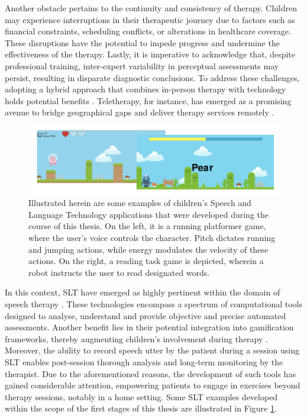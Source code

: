 Another obstacle pertains to the continuity and consistency of therapy. Children may experience interruptions in their therapeutic journey due to factors such as financial constraints, scheduling conflicts, or alterations in healthcare coverage. These disruptions have the potential to impede progress and undermine the effectiveness of the therapy. Lastly, it is imperative to acknowledge that, despite professional training, inter-expert variability in perceptual assessments may persist, resulting in disparate diagnostic conclusions. To address these challenges, adopting a hybrid approach that combines in-person therapy with technology holds potential benefits \cite{hilty2015new,barnett2011utilizing}. Teletherapy, for instance, has emerged as a promising avenue to bridge geographical gaps and deliver therapy services remotely \cite{hughes2019increasing}.

\begin{figure}
    \centering
    \includegraphics[width=1\textwidth]{imgs/exampleSLT.png}
    \caption{Illustrated herein are some examples of children's Speech and Language Technology applications that were developed during the course of this thesis. On the left, it is a running platformer game, where the user's voice controls the character. Pitch dictates running and jumping actions, while energy modulates the velocity of these actions. On the right, a reading task game is depicted, wherein a robot instructs the user to read designated words.}
    \label{fig:exSLT}

\end{figure}

In this context, \ac{SLT} have emerged as highly pertinent within the domain of speech therapy \cite{mendoza2022added}. These technologies encompass a spectrum of computational tools designed to analyse, understand and provide objective and precise automated assessments. Another benefit lies in their potential integration into gamification frameworks, thereby augmenting children's involvement during therapy \cite{brewer2013using}. Moreover, the ability to record speech utter by the patient during a session using \ac{SLT} enables post-session thorough analysis and long-term monitoring by the therapist. Due to the aforementioned reasons, the development of such tools has gained considerable attention, empowering patients to engage in exercises beyond therapy sessions, notably in a home setting. Some \ac{SLT} examples developed within the scope of the first stages of this thesis are illustrated in Figure \ref{fig:exSLT}.

